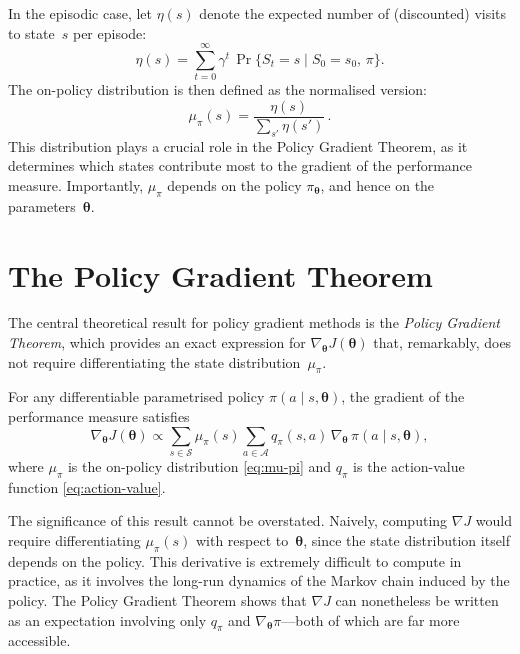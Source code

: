 \documentclass[a4paper,oneside,11pt]{report}
\begin{document}
In the episodic case, let $\eta(s)$ denote the expected number of (discounted) visits to state~$s$ per episode:
\begin{equation}\label{eq:eta}
  \eta(s) = \sum_{t=0}^{\infty} \gamma^t\, \Pr\{S_t = s \mid S_0 = s_0,\, \pi\}.
\end{equation}
The on-policy distribution is then defined as the normalised version:
\begin{equation}\label{eq:mu-pi}
  \mu_\pi(s) = \frac{\eta(s)}{\sum_{s'}\eta(s')}\,.
\end{equation}
This distribution plays a crucial role in the Policy Gradient Theorem, as it determines which states contribute most to the gradient of the performance measure. Importantly, $\mu_\pi$ depends on the policy $\pi_{\bm{\theta}}$, and hence on the parameters~$\bm{\theta}$.

\section{The Policy Gradient Theorem}
\label{sec:pgt}

The central theoretical result for policy gradient methods is the \emph{Policy Gradient Theorem}, which provides an exact expression for $\nabla_{\bm{\theta}} J(\bm{\theta})$ that, remarkably, does not require differentiating the state distribution~$\mu_\pi$.

\begin{theorem}
\label{thm:pgt}
For any differentiable parametrised policy $\pi(a\mid s,\bm{\theta})$, the gradient of the performance measure satisfies
\begin{equation}\label{eq:pgt}
  \nabla_{\bm{\theta}} J(\bm{\theta}) \propto \sum_{s\in\mathcal{S}} \mu_\pi(s) \sum_{a\in\mathcal{A}} q_\pi(s,a)\, \nabla_{\bm{\theta}}\,\pi(a\mid s,\bm{\theta}),
\end{equation}
where $\mu_\pi$ is the on-policy distribution \eqref{eq:mu-pi} and $q_\pi$ is the action-value function \eqref{eq:action-value}.
\end{theorem}

The significance of this result cannot be overstated. Naively, computing $\nabla J$ would require differentiating $\mu_\pi(s)$ with respect to~$\bm{\theta}$, since the state distribution itself depends on the policy. This derivative is extremely difficult to compute in practice, as it involves the long-run dynamics of the Markov chain induced by the policy. The Policy Gradient Theorem shows that $\nabla J$ can nonetheless be written as an expectation involving only $q_\pi$ and $\nabla_{\bm{\theta}}\pi$---both of which are far more accessible.
\end{document}
